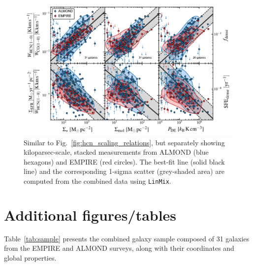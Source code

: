 \documentclass[letter, longauth]{aa} %
\begin{document}
\begin{appendix}
\begin{figure}
\centering
\includegraphics[width=\textwidth]{Figures/HCN_scaling_relations_empire_vs_almond_compressed.pdf}
\caption{Similar to Fig.~\ref{fig:hcn_scaling_relations}, but separately showing kiloparsec-scale, stacked measurements from ALMOND (blue hexagons) and EMPIRE (red circles).
The best-fit line (solid black line) and the corresponding 1-sigma scatter (grey-shaded area) are computed from the combined data using \texttt{LinMix}.
}
\label{fig:hcn_scaling_relations_almond_vs_empire}
\end{figure}



\section{Additional figures/tables}
\label{sec:app:fig_tab}

Table~\ref{tab:sample} presents the combined galaxy sample composed of 31 galaxies from the EMPIRE and ALMOND surveys, along with their coordinates and global properties.


\end{appendix}
\end{document}

